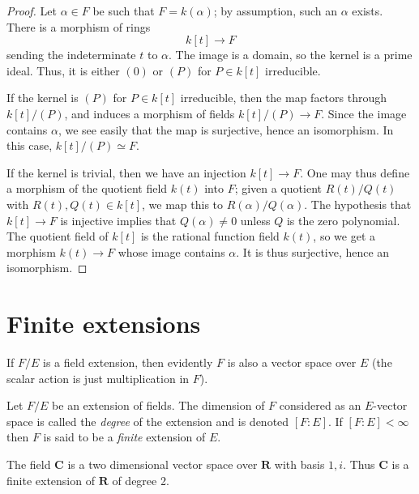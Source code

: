 \begin{proof}
Let $\alpha \in F$ be such that $F = k(\alpha)$; by assumption, such an
$\alpha$ exists. There is a morphism of rings
$$
k[t] \to F
$$
sending the indeterminate $t$ to $\alpha$. The image is a domain, so the
kernel is a prime ideal. Thus, it is either $(0)$ or $(P)$ for $P \in k[t]$
irreducible.

\medskip\noindent
If the kernel is $(P)$ for $P \in k[t]$ irreducible, then the map factors
through $k[t]/(P)$, and induces a morphism of fields $k[t]/(P) \to F$. Since
the image contains $\alpha$, we see easily that the map is surjective, hence
an isomorphism. In this case, $k[t]/(P) \simeq F$.

\medskip\noindent
If the kernel is trivial, then we have an injection $k[t] \to F$.
One may thus define a morphism of the quotient field $k(t)$ into $F$; given a
quotient $R(t)/Q(t)$ with $R(t), Q(t) \in k[t]$, we map this to
$R(\alpha)/Q(\alpha)$. The hypothesis that $k[t] \to F$ is injective implies
that $Q(\alpha) \neq 0$ unless $Q$ is the zero polynomial.
The quotient field of $k[t]$ is the rational function field $k(t)$, so we get
a morphism $k(t) \to F$
whose image contains $\alpha$. It is thus surjective, hence an isomorphism.
\end{proof}




\section{Finite extensions}
\label{section-finite-extensions}

\noindent
If $F/E$ is a field extension, then evidently $F$ is also a vector space
over $E$ (the scalar action is just multiplication in $F$).

\begin{definition}
\label{definition-degree}
Let $F/E$ be an extension of fields. The dimension of $F$ considered as an
$E$-vector space is called the {\it degree} of the extension and is
denoted $[F : E]$. If $[F : E]<\infty$ then $F$ is said to be a
{\it finite} extension of $E$.
\end{definition}

\begin{example}
\label{example-C-over-R}
The field $\mathbf{C}$ is a two dimensional vector space over $\mathbf{R}$
with basis $1, i$. Thus $\mathbf{C}$ is a finite extension of $\mathbf{R}$
of degree 2.
\end{example}

